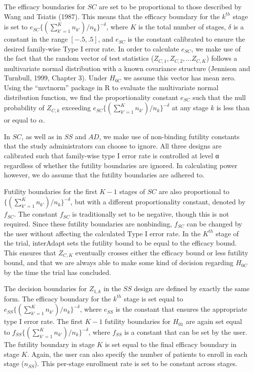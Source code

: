 \documentclass{article}
\newcommand{\interAdapt}{\textsf{interAdapt }}
\begin{document}
The efficacy boundaries for $SC$ are set to be proportional to those described by Wang and Tsiatis (1987). This means that the efficacy boundary for the $k^{th}$ stage is set to $e_{SC}\{(\sum_{k'=1}^{K} n_{k'})/n_k\}^{-δ}$, where $K$ is the total number of stages, $δ$ is a constant in the range $[-.5,.5]$, and $e_{SC}$ is the constant calibrated to ensure the desired family-wise Type I error rate. In order to calculate $e_{SC}$, we make use of the fact that the random vector of test statistics ($Z_{C,1},Z_{C,2},…Z_{C,K}$) follows a multivariate normal distribution with a known covariance structure (Jennison and Turnbull, 1999, Chapter 3)\cite{JennisonTurnbullBook}.
Under $H_{0C}$ we assume this vector has mean zero. Using the ``mvtnorm'' package \cite{mvtnorm} in R to evaluate the multivariate normal distribution function, we find the proportionality constant $e_{SC}$ such that the null probability of $Z_{C,k}$ exceeding $e_{SC}\{(\sum_{k'=1}^{K} n_{k'})/n_k\}^{-δ}$ at any stage $k$ is less than or equal to $α$.

In $SC$, as well as in $SS$ and $AD$, we make use of non-binding futility constants that the study administrators can choose to ignore. All three designs are calibrated such that family-wise type I error rate is controlled at level α regardless of whether the futility boundaries are ignored. In calculating power however, we do assume that the futility boundaries are adhered to.

Futility boundaries for the first $K-1$ stages of $SC$ are also proportional to $\{(\sum_{k'=1}^{K} n_{k'})/n_k\}^{-δ}$, but with a different proportionality constant, denoted by $f_{SC}$. The constant $f_{SC}$ is traditionally set to be negative, though this is not required. Since these futility boundaries are nonbinding, $f_{SC}$ can be changed by the user without affecting the calculated Type I error rate. In the $K ^{th}$ stage of the trial, \interAdapt sets the futility bound to be equal to the efficacy bound. This ensures that $Z_{C,K}$ eventually crosses either the efficacy bound or less futility bound, and that we are always able to make some kind of decision regarding $H_{0C}$ by the time the trial has concluded.

The decision boundaries for $Z_{1,k}$ in the $SS$ design are defined by exactly the same form. The efficacy boundary for the $k^{th}$ stage is set equal to $e_{SS}\{(\sum_{k'=1}^{K} n_{k'})/n_k\}^{-δ}$, where $e_{SS}$ is the constant that ensures the appropriate type I error rate. The first $K-1$ futility boundaries for $H_{01}$ are again set equal to $f_{SS}\{(\sum_{k'=1}^{K} n_{k'})/n_k\}^{-δ}$,  where $f_{SS}$ is a constant that can be set by the user. The futility boundary in stage $K$ is set equal to the final efficacy boundary in stage $K$. Again, the user can also specify the number of patients to enroll in each stage ($n_{SS}$). This per-stage enrollment rate is set to be constant across stages.
\end{document}
